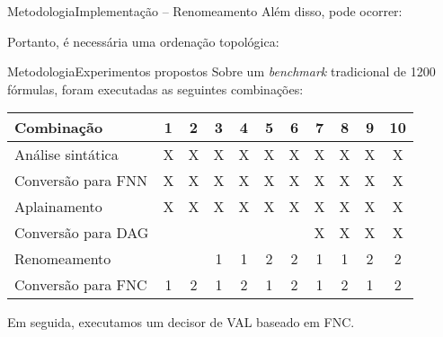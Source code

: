 \begin{frame}{Metodologia}{Implementação -- Renomeamento}
	Além disso, pode ocorrer:
	
	\pause
	\begin{figure}
		\centering
		
	\end{figure}
	
	\pause Portanto, é necessária uma ordenação topológica:
	
	\pause
	\begin{figure}
		\centering
		
	\end{figure}
\end{frame}

\begin{frame}{Metodologia}{Experimentos propostos}
	Sobre um \textit{benchmark} tradicional de 1200 fórmulas, foram executadas as seguintes combinações:
	
	\pause
	\vspace{.5cm}
	\begin{tabular}{l|cccccccccc}
		Combinação         & 1 & 2 & 3 & 4 & 5 & 6 & 7 & 8 & 9 & 10 \\ \hline
		Análise sintática  & X & X & X & X & X & X & X & X & X & X  \\
		Conversão para FNN & X & X & X & X & X & X & X & X & X & X  \\
		Aplainamento       & X & X & X & X & X & X & X & X & X & X  \\
		Conversão para DAG &   &   &   &   &   &   & X & X & X & X  \\
		Renomeamento       &   &   & 1 & 1 & 2 & 2 & 1 & 1 & 2 & 2  \\
		Conversão para FNC & 1 & 2 & 1 & 2 & 1 & 2 & 1 & 2 & 1 & 2  \\
	\end{tabular}
	
	\vspace{.4cm}
	\pause Em seguida, executamos um decisor de VAL baseado em FNC.
\end{frame}

